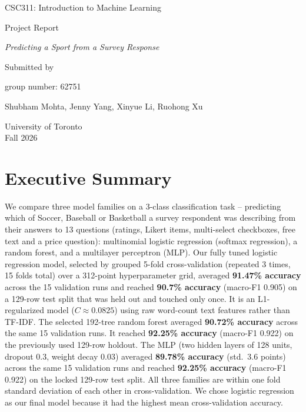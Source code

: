 \documentclass[12pt]{article}
\begin{document}
\begin{titlepage}
    \centering
    \vspace*{3cm}

    {\Large {CSC311: Introduction to Machine Learning} \par}
    \vspace{1cm}

    {\Large {Project Report} \par}
    \vspace{1cm}

    {\large \textit{Predicting a Sport from a Survey Response} \par}
    \vspace{3cm}

    {\large Submitted by \par}

    \vspace{0.5cm}
    {\large group number: 62751}

    \vspace{0.5cm}
    {\large Shubham Mohta, Jenny Yang, Xinyue Li, Ruohong Xu \par}

    \vfill
    {\large University of Toronto \\ Fall 2026 \par}
\end{titlepage}
\clearpage
\setcounter{page}{1}

\section{Executive Summary}

We compare three model families on a 3-class classification task -- predicting which of Soccer,
Baseball or Basketball a survey respondent was describing from their answers to 13 questions
(ratings, Likert items, multi-select checkboxes, free text and a price question): multinomial
logistic regression (softmax regression), a random forest, and a multilayer perceptron (MLP).
Our fully tuned logistic regression model, selected by grouped 5-fold cross-validation (repeated
3 times, 15 folds total) over a 312-point hyperparameter grid, averaged \textbf{91.47\% accuracy}
across the 15 validation runs and reached \textbf{90.7\% accuracy}
(macro-F1 0.905) on a 129-row test split that was held out and touched only once. It is an
L1-regularized model ($C \approx 0.0825$) using raw word-count text features rather than TF-IDF.
The selected 192-tree random forest averaged \textbf{90.72\% accuracy} across the same 15
validation runs. It reached \textbf{92.25\% accuracy} (macro-F1 0.922) on the previously
used 129-row holdout.
The MLP (two hidden layers of 128 units, dropout 0.3, weight decay 0.03) averaged
\textbf{89.78\% accuracy} (std.\ 3.6 points) across the same 15 validation runs and reached
\textbf{92.25\% accuracy} (macro-F1 0.922) on the locked 129-row test split. All three families
are within one fold standard deviation of each other in cross-validation.
We chose logistic regression as our final model because it had the highest mean cross-validation accuracy.
\end{document}
